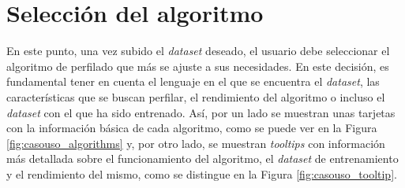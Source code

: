 \section{Selección del algoritmo}
\label{sec:casouso_algoritmo}

En este punto, una vez subido el \textit{dataset} deseado, el usuario debe seleccionar el algoritmo de perfilado que más se ajuste
a sus necesidades. En este decisión, es fundamental tener en cuenta el lenguaje en el que se encuentra el \textit{dataset},
las características que se buscan perfilar, el rendimiento del algoritmo o incluso el \textit{dataset} con el que ha sido entrenado.
Así, por un lado se muestran unas tarjetas con la información básica de cada algoritmo, como se puede ver
en la Figura \ref{fig:casouso_algorithms} y, por otro lado, se muestran \textit{tooltips} con información más detallada
sobre el funcionamiento del algoritmo, el \textit{dataset} de entrenamiento y el rendimiento del mismo,
como se distingue en la Figura \ref{fig:casouso_tooltip}.

